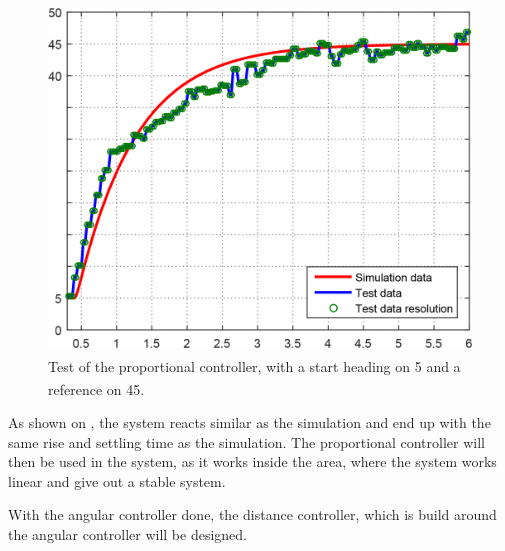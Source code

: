 \begin{figure}[H]
 	\centering
 	\includegraphics[scale=0.25]{figures/SteeringAngularTest.png}
 	\caption{Test of the proportional controller, with a start heading on \si{5^{\circ}} and a reference on \si{45^{\circ}}.}
 	\label{fig:AngularTestSim}
\end{figure}

As shown on , the system reacts similar as the simulation and end up with the same rise and settling time as the simulation. The proportional controller will then be used in the system, as it works inside the area, where the system works linear and give out a stable system.

With the angular controller done, the distance controller, which is build around the angular controller will be designed.